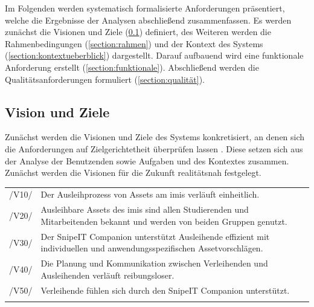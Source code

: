 Im Folgenden werden systematisch formalisierte Anforderungen präsentiert, welche die Ergebnisse der
Analysen abschließend zusammenfassen. Es werden zunächst die Visionen und Ziele
(\ref{section:visionziel}) definiert, des Weiteren werden die Rahmenbedingungen
(\ref{section:rahmen}) und der Kontext des Systems (\ref{section:kontextueberblick}) dargestellt.
Darauf aufbauend wird eine funktionale Anforderung erstellt (\ref{section:funktionale}).
Abschließend werden die Qualitätsanforderungen formuliert (\ref{section:qualität}).


\subsection{Vision und Ziele}
\label{section:visionziel}
Zunächst werden die Visionen und Ziele des Systems konkretisiert, an denen sich die Anforderungen
auf Zielgerichtetheit überprüfen lassen \cite{balzert2009}. Diese setzen sich aus der Analyse der
Benutzenden sowie Aufgaben und des Kontextes zusammen. Zunächst werden die Visionen für die Zukunft
realitätsnah festgelegt.

\begin{center}
        \renewcommand{\arraystretch}{1.5}
        \begin{longtable}{lp{}} \arrayrulecolor{maincolor}\hline
                \sffamily\color{maincolor}/V10/ & Der Ausleihprozess von Assets am \ac{imis}
                verläuft einheitlich.                                                           \\
                \sffamily\color{maincolor}/V20/ & Ausleihbare Assets des \ac{imis} sind allen
                Studierenden und Mitarbeitenden bekannt und werden von beiden Gruppen genutzt.  \\
                \sffamily\color{maincolor}/V30/ & Der SnipeIT Companion unterstützt Ausleihende
                effizient mit individuellen und anwendungsspezifischen Assetvorschlägen.        \\
                \sffamily\color{maincolor}/V40/ & Die Planung und Kommunikation zwischen
                Verleihenden und Ausleihenden verläuft reibungsloser.                           \\
                \sffamily\color{maincolor}/V50/ & Verleihende fühlen sich durch den SnipeIT
                Companion unterstützt.                                                          \\
                \arrayrulecolor{maincolor}\hline
        \end{longtable}
\end{center}
\vspace*{-1.5cm}

